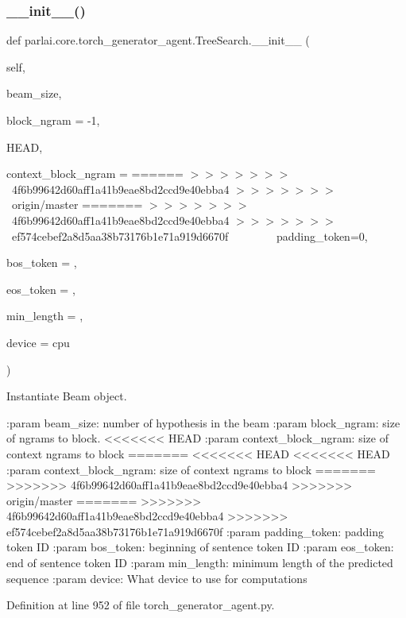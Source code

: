 \subsubsection{\texorpdfstring{\+\_\+\+\_\+init\+\_\+\+\_\+()}{\_\_init\_\_()}}
{\footnotesize\ttfamily def parlai.\+core.\+torch\+\_\+generator\+\_\+agent.\+Tree\+Search.\+\_\+\+\_\+init\+\_\+\+\_\+ (\begin{DoxyParamCaption}\item[{}]{self,  }\item[{}]{beam\+\_\+size,  }\item[{}]{block\+\_\+ngram = {\ttfamily -\/1},  }\item[{}]{H\+E\+AD,  }\item[{}]{context\+\_\+block\+\_\+ngram = {\ttfamily ======
$>$$>$$>$$>$$>$$>$$>$~4f6b99642d60aff1a41b9eae8bd2ccd9e40ebba4
$>$$>$$>$$>$$>$$>$$>$~origin/master
=======
$>$$>$$>$$>$$>$$>$$>$~4f6b99642d60aff1a41b9eae8bd2ccd9e40ebba4
$>$$>$$>$$>$$>$$>$$>$~ef574cebef2a8d5aa38b73176b1e71a919d6670f
~~~~~~~~padding\+\_\+token=0},  }\item[{}]{bos\+\_\+token = {},  }\item[{}]{eos\+\_\+token = {},  }\item[{}]{min\+\_\+length = {},  }\item[{}]{device = {\ttfamily \textquotesingle{}cpu\textquotesingle{}} }\end{DoxyParamCaption})}

\begin{DoxyVerb}Instantiate Beam object.

:param beam_size:
    number of hypothesis in the beam
:param block_ngram:
    size of ngrams to block.
<<<<<<< HEAD
:param context_block_ngram:
    size of context ngrams to block
=======
<<<<<<< HEAD
<<<<<<< HEAD
:param context_block_ngram:
    size of context ngrams to block
=======
>>>>>>> 4f6b99642d60aff1a41b9eae8bd2ccd9e40ebba4
>>>>>>> origin/master
=======
>>>>>>> 4f6b99642d60aff1a41b9eae8bd2ccd9e40ebba4
>>>>>>> ef574cebef2a8d5aa38b73176b1e71a919d6670f
:param padding_token:
    padding token ID
:param bos_token:
    beginning of sentence token ID
:param eos_token:
    end of sentence token ID
:param min_length:
    minimum length of the predicted sequence
:param device:
    What device to use for computations
\end{DoxyVerb}
 

Definition at line 952 of file torch\+\_\+generator\+\_\+agent.\+py.


